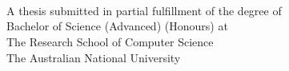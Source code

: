
\begin{titlepage}
  \enlargethispage{2cm}
  \begin{center}
    \makeatletter
    \Huge\textbf{\@title} \\[.4cm]
    \Huge\textbf{\thesisqualifier} \\[2.5cm]
    \huge\textbf{\@author} \\[8.5cm]
    \makeatother
    \Large A thesis submitted in partial fulfillment of the degree of \\
    \LARGE Bachelor of Science (Advanced) (Honours) at \\
    The Research School of Computer Science\\
    The Australian National University \\[2cm]
    \thismonth
  \end{center}
\end{titlepage}

